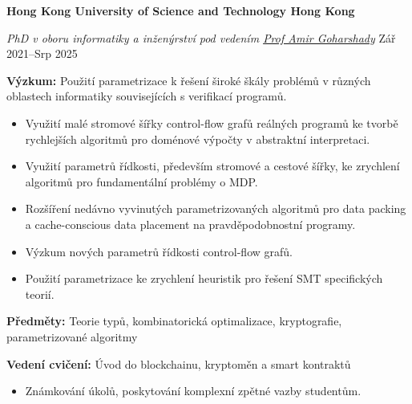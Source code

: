 \ifczech

\textbf{Hong Kong University of Science and Technology \hfill Hong Kong} \par
\textit{PhD v oboru informatiky a inženýrství pod vedením \href{https://scholar.google.com/citations?user=4o8gvAYAAAAJ&hl=en&oi=ao}{Prof Amir Goharshady}} \hfill Zář 2021--Srp 2025\par
\textbf{Výzkum:} Použití parametrizace k řešení široké škály problémů v různých oblastech informatiky souvisejících s verifikací programů.
    \begin{itemize}
\item Využití malé stromové šířky control-flow grafů reálných programů ke tvorbě rychlejších algoritmů pro doménové výpočty v abstraktní interpretaci.
        \item Využití parametrů řídkosti, především stromové a cestové šířky, ke zrychlení algoritmů pro fundamentální problémy o MDP.
        \item Rozšíření nedávno vyvinutých parametrizovaných algoritmů pro data packing a cache-conscious data placement na pravděpodobnostní programy.
        \item Výzkum nových parametrů řídkosti control-flow grafů. 
        \item Použití parametrizace ke zrychlení heuristik pro řešení SMT specifických teorií.
    \end{itemize} \par
\textbf{Předměty:} Teorie typů, kombinatorická optimalizace, kryptografie, parametrizované algoritmy \par
\textbf{Vedení cvičení:} Úvod do blockchainu, kryptoměn a smart kontraktů
\begin{itemize}
    \item Známkování úkolů, poskytování komplexní zpětné vazby studentům.
\end{itemize}

\else

